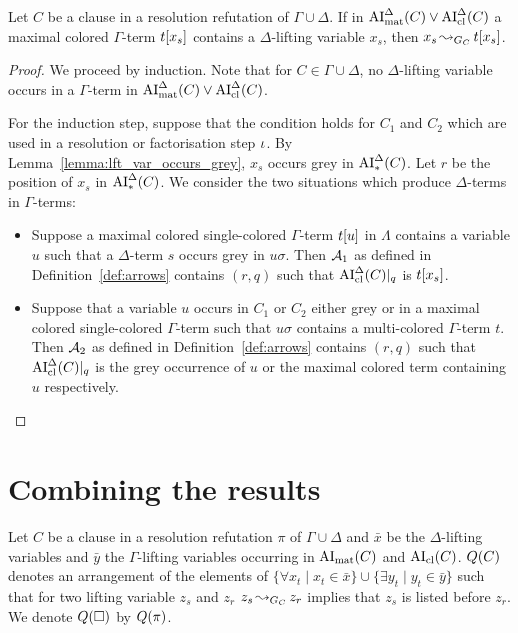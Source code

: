 \documentclass[,%
	draft=false,%
	numbers=noendperiod
	11pt,
	a4paper,
	oneside,%
	openany,
]{memoir}
\begin{document}
\begin{lemma}
	\label{lemma:arrow_for_lft_var}
	Let $C$ be a clause in a resolution refutation of $\Gamma \cup \Delta$.
	If in $\operatorname{AI}_\mathrm{mat}^\Delta(C) \lor \operatorname{AI}_\mathrm{cl}^\Delta(C)$	a maximal colored $\Gamma$-term $t[x_s]$ contains a $\Delta$-lifting variable $x_s$,
	then $x_s \operatorname{\leadsto}_{G_C} t[x_s]$.
\end{lemma}
\begin{proof}
	We proceed by induction. Note that for $C\in\Gamma\cup\Delta$, no $\Delta$-lifting variable occurs in a $\Gamma$-term in $\operatorname{AI}_\mathrm{mat}^\Delta(C) \lor \operatorname{AI}_\mathrm{cl}^\Delta(C)$.

	For the induction step, suppose that the condition holds for $C_1$ and $C_2$ which are used in a resolution or factorisation step $\iota$.
	By Lemma~\ref{lemma:lft_var_occurs_grey}, $x_s$ occurs grey in $\operatorname{AI}_\mathrm{*}^\Delta(C)$. Let $r$ be the position of $x_s$ in $\operatorname{AI}_\mathrm{*}^\Delta(C)$.
	We consider the two situations which produce $\Delta$-terms in $\Gamma$-terms:
	\begin{itemize}
		\item Suppose a maximal colored single-colored $\Gamma$-term $t[u]$ in $\Lambda$ contains a variable $u$ such that a $\Delta$-term $s$ occurs grey in $u\sigma$.
			Then $\operatorname{\mathcal{A}}_1$ as defined in Definition~\ref{def:arrows} contains $(r, q)$ such that $\operatorname{AI}_\mathrm{cl}^\Delta(C)|_{q}$ is $t[x_s]$.

		\item
			Suppose that a variable $u$ occurs in $C_1$ or $C_2$ either grey or in a maximal colored single-colored $\Gamma$-term such that $u\sigma$ contains a multi-colored $\Gamma$-term $t$.
			Then $\operatorname{\mathcal{A}}_2$ as defined in Definition~\ref{def:arrows} contains $(r, q)$ such that $\operatorname{AI}_\mathrm{cl}^\Delta(C)|_{q}$ is the grey occurrence of $u$ or the maximal colored term containing $u$ respectively.
			\qedhere
	\end{itemize}

\end{proof}



\section{Combining the results}

\begin{defi}
	\label{def:arrow_quantifier_block}
	Let $C$ be a clause in a resolution refutation $\pi$ of $\Gamma\cup\Delta$
	and $\bar x$ be the $\Delta$-lifting variables and $\bar y$ the $\Gamma$-lifting variables occurring in $\operatorname{AI}_\mathrm{mat}(C)$ and $\operatorname{AI}_\mathrm{cl}(C)$.
	$Q(C)$ denotes an arrangement of the elements of  $\{ \forall x_t \mid x_t \in \bar x\} \cup \{ \exists y_t \mid y_t \in \bar y\}$ such that for two lifting variable $z_s$ and $z_r$ $z_s \operatorname{\leadsto}_{G_C} z_r$ implies that $z_s$ is listed before $z_r$.
	We denote $Q(\square)$ by $Q(\pi)$.
\end{defi}
\end{document}
